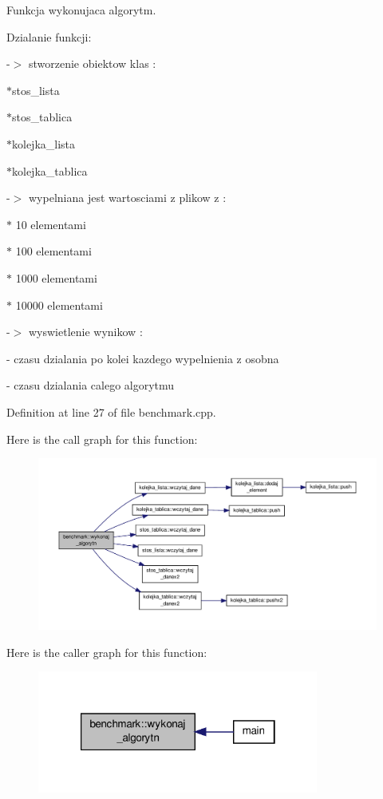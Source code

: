 Funkcja wykonujaca algorytm. 

Dzialanie funkcji\-: \par
-\/$>$ stworzenie obiektow klas \-: \par
 $\ast$stos\-\_\-lista \par
 $\ast$stos\-\_\-tablica \par
 $\ast$kolejka\-\_\-lista \par
 $\ast$kolejka\-\_\-tablica \par
-\/$>$ wypelniana jest wartosciami z plikow z \-: \par
 $\ast$ 10 elementami \par
 $\ast$ 100 elementami \par
 $\ast$ 1000 elementami \par
 $\ast$ 10000 elementami \par
-\/$>$ wyswietlenie wynikow \-: \par
-\/ czasu dzialania po kolei kazdego wypelnienia z osobna \par
-\/ czasu dzialania calego algorytmu 

Definition at line 27 of file benchmark.\-cpp.



Here is the call graph for this function\-:\nopagebreak
\begin{figure}[H]
\begin{center}
\leavevmode
\includegraphics[width=350pt]{classbenchmark_aacae513e2f55669c83f37a07110f3989_cgraph}
\end{center}
\end{figure}




Here is the caller graph for this function\-:\nopagebreak
\begin{figure}[H]
\begin{center}
\leavevmode
\includegraphics[width=262pt]{classbenchmark_aacae513e2f55669c83f37a07110f3989_icgraph}
\end{center}
\end{figure}





